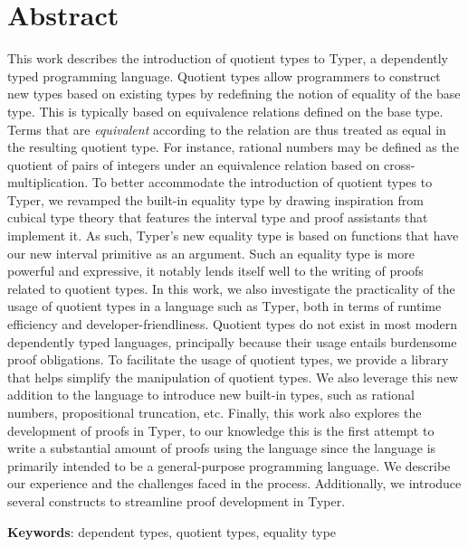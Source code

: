 \documentclass[12pt,twoside,maitrise]{dms}
\theoremstyle{definition}
\numberwithin{equation}{section}
\numberwithin{table}{chapter}
\numberwithin{figure}{chapter}
\begin{document}
\anglais
\chapter*{Abstract}

This work describes the introduction of quotient types to
Typer\cite{monnier2019typer}, a dependently typed programming language. Quotient
types allow programmers to construct new types based on existing types by
redefining the notion of equality of the base type. This is typically based on
equivalence relations defined on the base type. Terms that are \emph{equivalent}
according to the relation are thus treated as equal in the resulting quotient
type. For instance, rational numbers may be defined as the quotient of pairs of
integers under an equivalence relation based on cross-multiplication. To better
accommodate the introduction of quotient types to Typer, we revamped the
built-in equality type by drawing inspiration from cubical type theory that
features the interval type and proof assistants that implement it. As such,
Typer's new equality type is based on functions that have our new interval
primitive as an argument. Such an equality type is more powerful and expressive,
it notably lends itself well to the writing of proofs related to quotient types.
In this work, we also investigate the practicality of the usage of quotient
types in a language such as Typer, both in terms of runtime efficiency and
developer-friendliness. Quotient types do not exist in most modern dependently
typed languages, principally because their usage entails burdensome proof
obligations. To facilitate the usage of quotient types, we provide a library
that helps simplify the manipulation of quotient types. We also leverage this
new addition to the language to introduce new built-in types, such as rational
numbers, propositional truncation, etc. Finally, this work also explores the
development of proofs in Typer, to our knowledge this is the first attempt to
write a substantial amount of proofs using the language since the language is
primarily intended to be a general-purpose programming language. We describe our
experience and the challenges faced in the process. Additionally, we introduce
several constructs to streamline proof development in Typer.

\textbf{Keywords}: dependent types, quotient types, equality type

\end{document}

